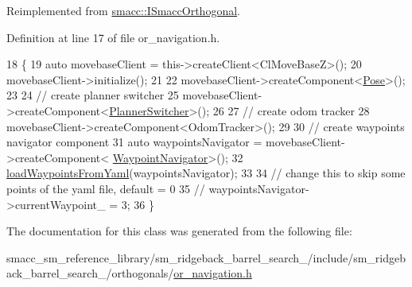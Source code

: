 Reimplemented from \hyperlink{classsmacc_1_1ISmaccOrthogonal_a6bb31c620cb64dd7b8417f8705c79c7a}{smacc\+::\+I\+Smacc\+Orthogonal}.



Definition at line 17 of file or\+\_\+navigation.\+h.


\begin{DoxyCode}
18         \{
19             \textcolor{keyword}{auto} movebaseClient = this->createClient<ClMoveBaseZ>();
20             movebaseClient->initialize();
21 
22             movebaseClient->createComponent<\hyperlink{classcl__move__base__z_1_1Pose}{Pose}>();
23 
24             \textcolor{comment}{// create planner switcher}
25             movebaseClient->createComponent<\hyperlink{classcl__move__base__z_1_1PlannerSwitcher}{PlannerSwitcher}>();
26 
27             \textcolor{comment}{// create odom tracker}
28             movebaseClient->createComponent<OdomTracker>();
29 
30             \textcolor{comment}{// create waypoints navigator component}
31             \textcolor{keyword}{auto} waypointsNavigator = movebaseClient->createComponent<
      \hyperlink{classcl__move__base__z_1_1WaypointNavigator}{WaypointNavigator}>();
32             \hyperlink{classsm__ridgeback__barrel__search__1_1_1OrNavigation_a875df5d1fdcd34f568e6db573dfbaed7}{loadWaypointsFromYaml}(waypointsNavigator);
33 
34             \textcolor{comment}{// change this to skip some points of the yaml file, default = 0}
35             \textcolor{comment}{// waypointsNavigator->currentWaypoint\_ = 3;}
36         \}
\end{DoxyCode}


The documentation for this class was generated from the following file\+:\begin{DoxyCompactItemize}
\item 
smacc\+\_\+sm\+\_\+reference\+\_\+library/sm\+\_\+ridgeback\+\_\+barrel\+\_\+search\+\_/include/sm\+\_\+ridgeback\+\_\+barrel\+\_\+search\+\_/orthogonals/\hyperlink{sm__ridgeback__barrel__search__1_2include_2sm__ridgeback__barrel__search__1_2orthogonals_2or__navigation_8h}{or\+\_\+navigation.\+h}\end{DoxyCompactItemize}
